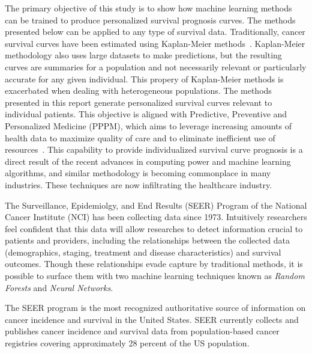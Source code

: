 \documentclass[10pt,letterpaper]{article}
\begin{document}
The primary objective of this study is to show how machine learning methods can be trained to produce personalized survival prognosis curves. The methods presented below can be applied to any type of survival data. Traditionally, cancer survival curves have been estimated using Kaplan-Meier methods~\cite{cam}. Kaplan-Meier methodology also uses large datasets to make predictions, but the resulting curves are summaries for a population and not necessarily relevant or particularly accurate for any given individual. This propery of Kaplan-Meier methods is exacerbated when dealing with heterogeneous populations.  The methods presented in this report generate personalized survival curves relevant to individual patients. This objective is aligned with Predictive, Preventive and Personalized Medicine (PPPM), which aims to leverage increasing amounts of health data to maximize quality of care and to eliminate inefficient use of resources~\cite{VanPoucke2016}.
This capability to provide individualized survival curve prognosis is a direct result of the recent advances in computing power and machine learning algorithms, and similar methodology is becoming commonplace in many industries.
 These techniques are now infiltrating the healthcare industry.
 



The Surveillance, Epidemiolgy, and End Results (SEER) Program of the National Cancer Institute (NCI) has been collecting data since 1973.
Intuitively 
researchers feel confident
 that this data will allow researches to detect information crucial to patients and providers, including the relationships between the collected data (demographics, staging, treatment and disease characteristics) and survival outcomes.
Though these relationships evade capture by traditional methods, it is possible to surface them with two machine learning techniques known as \emph{Random Forests} and \emph{Neural Networks}.

The SEER program is the most recognized authoritative source of information on cancer incidence and survival in the United States. SEER currently collects and publishes cancer incidence and survival data from population-based cancer registries covering approximately 28 percent of the US population.
\end{document}
